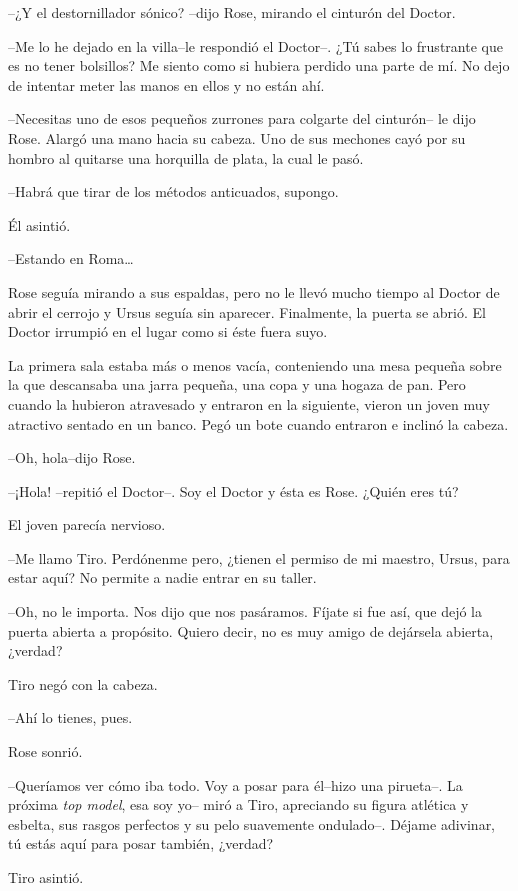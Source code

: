 --¿Y el destornillador sónico? --dijo Rose, mirando el cinturón del
Doctor.

--Me lo he dejado en la villa--le respondió el Doctor--. ¿Tú sabes lo
frustrante que es no tener bolsillos? Me siento como si hubiera perdido
una parte de mí. No dejo de intentar meter las manos en ellos y no están
ahí.

--Necesitas uno de esos pequeños zurrones para colgarte del cinturón--
le dijo Rose. Alargó una mano hacia su cabeza. Uno de sus mechones cayó
por su hombro al quitarse una horquilla de plata, la cual le pasó.

--Habrá que tirar de los métodos anticuados, supongo.

Él asintió.

--Estando en Roma\ldots{}

Rose seguía mirando a sus espaldas, pero no le llevó mucho tiempo al
Doctor de abrir el cerrojo y Ursus seguía sin aparecer. Finalmente, la
puerta se abrió. El Doctor irrumpió en el lugar como si éste fuera suyo.

La primera sala estaba más o menos vacía, conteniendo una mesa pequeña
sobre la que descansaba una jarra pequeña, una copa y una hogaza de pan.
Pero cuando la hubieron atravesado y entraron en la siguiente, vieron un
joven muy atractivo sentado en un banco. Pegó un bote cuando entraron e
inclinó la cabeza.

--Oh, hola--dijo Rose.

--¡Hola! --repitió el Doctor--. Soy el Doctor y ésta es Rose. ¿Quién
eres tú?

El joven parecía nervioso.

--Me llamo Tiro. Perdónenme pero, ¿tienen el permiso de mi maestro,
Ursus, para estar aquí? No permite a nadie entrar en su taller.

--Oh, no le importa. Nos dijo que nos pasáramos. Fíjate si fue así, que
dejó la puerta abierta a propósito. Quiero decir, no es muy amigo de
dejársela abierta, ¿verdad?

Tiro negó con la cabeza.

--Ahí lo tienes, pues.

Rose sonrió.

--Queríamos ver cómo iba todo. Voy a posar para él--hizo una pirueta--.
La próxima \emph{top model}, esa soy yo-- miró a Tiro, apreciando su
figura atlética y esbelta, sus rasgos perfectos y su pelo suavemente
ondulado--. Déjame adivinar, tú estás aquí para posar también, ¿verdad?

Tiro asintió.


